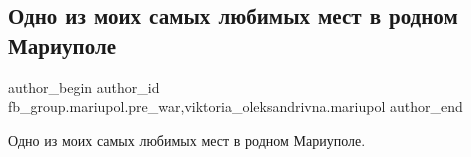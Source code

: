  
 
 
 
 

\subsection{Одно из моих самых любимых мест в родном Мариуполе}
\label{sec:09_02_2023.fb.fb_group.mariupol.pre_war.2.odno_iz_moikh_samikh}
 
\ifcmt
 author_begin
   author_id fb_group.mariupol.pre_war,viktoria_oleksandrivna.mariupol
 author_end
\fi

Одно из моих самых любимых мест в родном Мариуполе.

